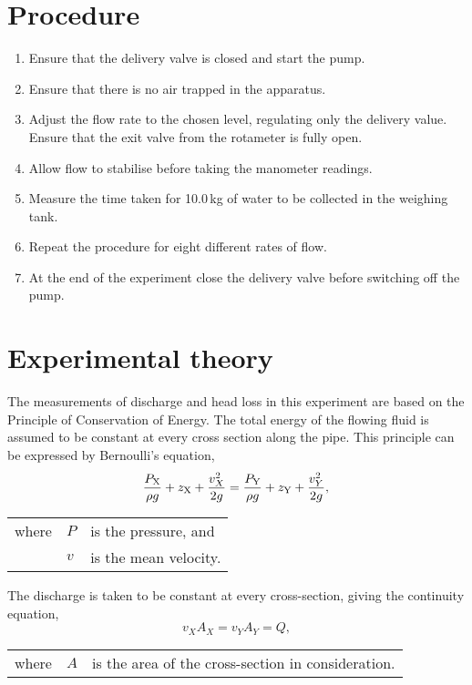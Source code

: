 \documentclass[a4paper]{article}
\begin{document}
\section{Procedure}
\begin{enumerate}
\item Ensure that the delivery valve is closed and start the pump.
\item Ensure that there is no air trapped in the apparatus.
\item Adjust the flow rate to the chosen level, 
      regulating only the delivery value. Ensure that the exit valve
      from the rotameter is fully open.
\item Allow flow to stabilise before taking the manometer readings.
\item Measure the time taken for 10.0\,kg of water to be collected
      in the weighing tank.
\item Repeat the procedure for eight different rates of flow.
\item At the end of the experiment close the delivery valve 
      before switching off the pump.
\end{enumerate}

\section{Experimental theory}
The measurements of discharge and head loss in this experiment 
are based on the Principle of Conservation of Energy.
The total energy of the flowing fluid is assumed 
to be constant at every cross section along the pipe.
This principle can be expressed by Bernoulli's equation,
\begin{equation}
\label{eq:bernoulli}
\frac{P_\text{X}}{\rho g}+ z_\text{X} + \frac{v^2_X}{2g}
= \frac{P_\text{Y}}{\rho g}+ z_\text{Y} + \frac{v^2_Y}{2g}, \\
\end{equation}
\begin{tabular}{rll}
where &$P$& is the pressure, and \\
      &$v$& is the mean velocity. \\
\end{tabular}

The discharge is taken to be constant at every cross-section,
giving the continuity equation,
\begin{equation}
\label{eq:continuity}
v_XA_X = v_YA_Y = Q,
\end{equation}
\begin{tabular}{rll}
where &$A$& is the area of the cross-section in consideration.
\end{tabular}
\end{document}
